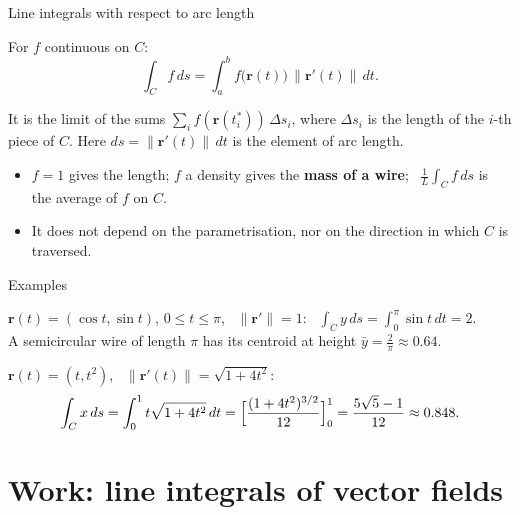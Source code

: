\documentclass[10pt]{wosm-slides}
\newcommand{\norm}[1]{\lVert #1 \rVert}
\newcommand{\vr}{\mathbf{r}}
\begin{document}
\begin{frame}{Line integrals with respect to arc length}
  \begin{definition}
    For $f$ continuous on $C$:
    \[ \int_C f\, ds = \int_a^b f\bigl(\vr(t)\bigr)\, \norm{\vr'(t)}\, dt . \]
  \end{definition}
  It is the limit of the sums $\sum_i f(\vr(t_i^*))\, \Delta s_i$, where $\Delta s_i$ is the length of
  the $i$-th piece of $C$. Here $ds = \norm{\vr'(t)}\, dt$ is the element of arc length.
  \pause
  \begin{itemize}
    \item $f = 1$ gives the length; $f$ a density gives the \textbf{mass of a wire}; \
      $\frac1L \int_C f\, ds$ is the average of $f$ on $C$.
    \item It does not depend on the parametrisation, nor on the direction in which $C$ is traversed.
  \end{itemize}
\end{frame}

\begin{frame}{Examples}
  \begin{example}[The upper half of the unit circle, $f = y$]
    $\vr(t) = (\cos t, \sin t)$, $0 \le t \le \pi$, \ $\norm{\vr'} = 1$:
    \ $\displaystyle \int_C y\, ds = \int_0^\pi \sin t\, dt = 2$.
    \\[0.2em]
    A semicircular wire of length $\pi$ has its centroid at height $\bar y = \frac{2}{\pi} \approx 0.64$.
  \end{example}
  \pause
  \begin{example}[The parabola $y = x^2$, $0 \le x \le 1$, \ $f = x$]
    $\vr(t) = (t, t^2)$, \ $\norm{\vr'(t)} = \sqrt{1 + 4t^2}$:
    \[ \int_C x\, ds = \int_0^1 t\sqrt{1 + 4t^2}\, dt = \Bigl[\frac{(1 + 4t^2)^{3/2}}{12}\Bigr]_0^1
       = \frac{5\sqrt5 - 1}{12} \approx 0.848 . \]
  \end{example}
\end{frame}

\section{Work: line integrals of vector fields}
\end{document}
